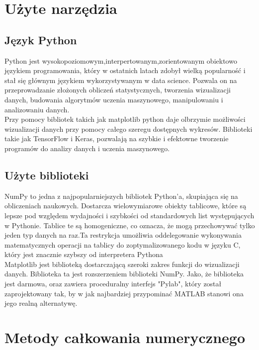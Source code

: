 \documentclass[12pt,twoside]{article}
\begin{document}
\clearpage

\section{Użyte narzędzia}

\subsection{Język Python}

Python jest  wysokopoziomowym,interpertowanym,zorientowanym obiektowo językiem programowania, który w ostatnich latach zdobył wielką popularność i stał się głównym językiem wykorzystywanym w data science.\cite{Python_1} Pozwala on na przeprowadzanie złożonych obliczeń statystycznych, tworzenia wizualizacji danych, budowania algorytmów uczenia maszynowego, manipulowaniu i analizowaniu danych.\\
Przy pomocy bibliotek takich jak matplotlib python daje olbrzymie możliwości wizualizacji danych przy pomocy całego szeregu dostępnych wykresów.
Biblioteki takie jak TensorFlow i Keras, pozwalają na szybkie i efektowne tworzenie programów do analizy danych i uczenia maszynowego.\cite{Python_2}

\subsection{Użyte biblioteki}

NumPy to jedna z najpopularniejszych bibliotek Python'a, skupiająca się na obliczeniach naukowych. Dostarcza wielowymiarowe obiekty tablicowe, które są lepsze pod względem wydajności i szybkości od standardowych list występujących w Pythonie.\cite{Numpy_1} Tablice te są homogeniczne, co oznacza, że mogą przechowywać tylko jeden typ danych na raz.Ta restrykcja umożliwia oddelegowanie wykonywania matematycznych operacji na tablicy do zoptymalizowanego kodu w języku C, który jest znacznie szybszy od interpretera Pythona\cite{Numpy_2}\\

Matplotlib jest biblioteką dostarczającą szeroki zakres funkcji do wizualizacji danych. Biblioteka ta jest rozszerzeniem biblioteki NumPy. Jako, że biblioteka jest darmowa, oraz zawiera proceduralny interfejs "Pylab", który został zaprojektowany tak, by w jak najbardziej przypominać MATLAB stanowi ona jego realną alternatywę.

\section{Metody całkowania numerycznego}
\end{document}
